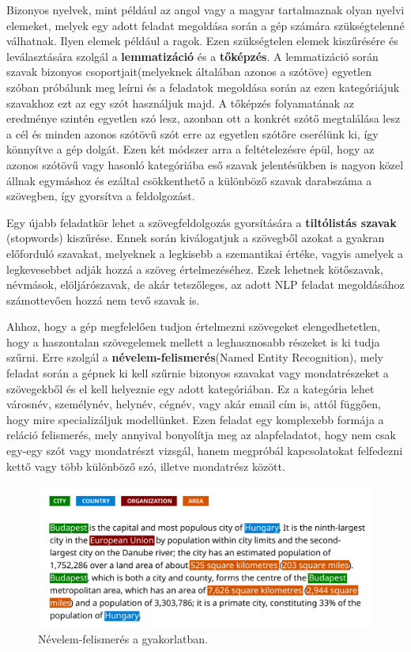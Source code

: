 Bizonyos nyelvek, mint például az angol vagy a magyar tartalmaznak olyan nyelvi elemeket, melyek egy adott feladat megoldása során a gép számára szükségtelenné válhatnak. Ilyen elemek például a ragok. Ezen szükségtelen elemek kiszűrésére és leválasztására szolgál a \textbf{lemmatizáció} és a \textbf{tőképzés}. A lemmatizáció során szavak bizonyos csoportjait(melyeknek általában azonos a szótöve) egyetlen szóban próbálunk meg leírni és a feladatok megoldása során az ezen kategóriájuk szavakhoz ezt az egy szót használjuk majd. A tőképzés folyamatának az eredménye szintén egyetlen szó lesz, azonban ott a konkrét szótő megtalálása lesz a cél és minden azonos szótövű szót erre az egyetlen szótőre cserélünk ki, így könnyítve a gép dolgát. Ezen két módszer arra a feltételezésre épül, hogy az azonos szótövű vagy hasonló kategóriába eső szavak jelentésükben is nagyon közel állnak egymáshoz és ezáltal csökkenthető a különböző szavak darabszáma a szövegben, így gyorsítva a feldolgozást.

Egy újabb feladatkör lehet a szövegfeldolgozás gyorsítására a \textbf{tiltólistás szavak} \\
(stopwords) kiszűrése. Ennek során kiválogatjuk a szövegből azokat a gyakran előforduló szavakat, melyeknek a legkisebb a szemantikai értéke, vagyis amelyek a legkevesebbet adják hozzá a szöveg értelmezéséhez. Ezek lehetnek kötőszavak, névmások, elöljárószavak, de akár tetszőleges, az adott NLP feladat megoldásához számottevően hozzá nem tevő szavak is.

Ahhoz, hogy a gép megfelelően tudjon értelmezni szövegeket elengedhetetlen, hogy a haszontalan szövegelemek mellett a leghasznosabb részeket is ki tudja szűrni. Erre szolgál a \textbf{névelem-felismerés}(Named Entity Recognition), mely feladat során a gépnek ki kell szűrnie bizonyos szavakat vagy mondatrészeket a szövegekből és el kell helyeznie egy adott kategóriában. Ez a kategória lehet városnév, személynév, helynév, cégnév, vagy akár email cím is, attól függően, hogy mire specializáljuk modellünket. Ezen feladat egy komplexebb formája a reláció felismerés, mely annyival bonyolítja meg az alapfeladatot, hogy nem csak egy-egy szót vagy mondatrészt vizsgál, hanem megpróbál kapcsolatokat felfedezni kettő vagy több különböző szó, illetve mondatrész között.

\begin{figure}[h]
\centering
\includegraphics[scale=0.35]{images/named_entity.png}
\caption{Névelem-felismerés a gyakorlatban.}
\label{fig:named_entity}
\end{figure}

